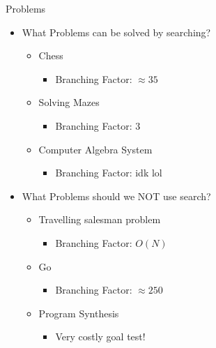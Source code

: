 \documentclass[presentation]{beamer}
\begin{document}
\begin{frame}{Problems}
  \begin{itemize}
  \item What Problems can be solved by searching?
    \begin{itemize}
    \item <1-> Chess
      \begin{itemize}
      \item <7-> Branching Factor: $\approx 35$
      \end{itemize}
    \item <2-> Solving Mazes
      \begin{itemize}
      \item <8-> Branching Factor: $3$
      \end{itemize}
    \item <3-> Computer Algebra
      System
      \begin{itemize}
      \item <9-> Branching Factor:
        idk lol
      \end{itemize}
    \end{itemize}
  \item What Problems should we NOT use search?
    \begin{itemize}
    \item <4-> Travelling salesman problem
      \begin{itemize}
      \item <10-> Branching Factor: $O(N)$
      \end{itemize}
    \item <5-> Go
      \begin{itemize}
      \item <11-> Branching Factor: $\approx 250$
      \end{itemize}
    \item <6-> Program Synthesis
      \begin{itemize}
      \item <12-> Very costly goal test!
      \end{itemize}
    \end{itemize}
  \end{itemize}
\end{frame}
\end{document}
